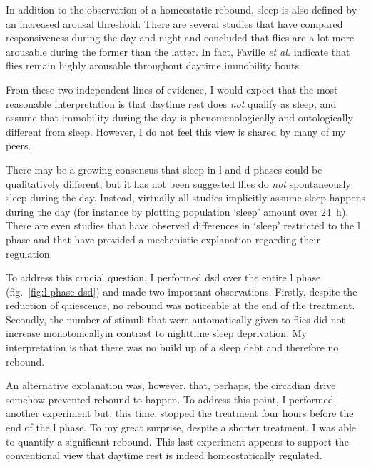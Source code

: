 In addition to the observation of a homeostatic rebound, sleep is also defined by an increased arousal threshold.
There are several studies that have compared responsiveness during the day and night and concluded that flies are a lot more arousable during the former than the latter\cite{huber_sleep_2004,van_alphen_dynamic_2013,faville_how_2015}.
In fact, Faville \emph{et al.} indicate that flies remain highly arousable throughout daytime immobility bouts\cite{faville_how_2015}.


From these two independent lines of evidence,
I would expect that the most reasonable interpretation
is that daytime rest does \emph{not} qualify as sleep, and assume that immobility during the day is phenomenologically and ontologically different from sleep.
However, I do not feel this view is shared by many of my peers.

There may be a growing consensus that sleep in \gls{l} and \gls{d} phases could be qualitatively different\cite{van_alphen_dynamic_2013,faville_how_2015}, but it has not been suggested flies do \emph{not} spontaneously sleep during the day.
Instead, virtually all studies implicitly assume sleep happens during the day (for instance by plotting population `sleep' amount over 24~h).
There are even studies that have observed differences in `sleep' restricted to the \gls{l} phase and that have provided a mechanistic explanation regarding their regulation\cite{ganguly-fitzgerald_waking_2006, donlea_use-dependent_2009, parisky_pdf_2008,chen_genetic_2017}.


To address this crucial question, I performed \gls{dsd} over the entire \gls{l} phase (fig.~\ref{fig:l-phase-dsd}) and made two important observations.
Firstly, despite the reduction of quiescence, no rebound was noticeable at the end of the treatment.
Secondly, the number of stimuli that were automatically given to flies did not increase monotonically\emd{}in contrast to nighttime sleep deprivation. 
My interpretation is that there was no build up of a sleep debt and therefore no rebound.

An alternative explanation was, however, that, perhaps, the circadian drive somehow prevented rebound to happen.
To address this point, I performed another experiment but, this time, stopped the treatment four hours before the end of the \gls{l} phase.
To my great surprise, despite a shorter treatment, I was able to quantify a significant rebound.
This last experiment appears to support the conventional view that daytime rest is indeed homeostatically regulated.

